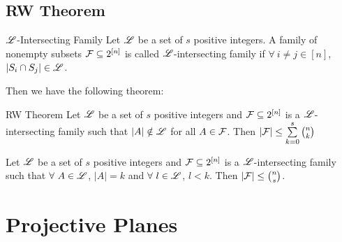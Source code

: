 \subsection{RW Theorem}
\begin{Definition}{${\mathscr{L}}$-Intersecting Family}{}
	Let ${\mathscr{L}}$ be a set of $s$ positive integers. A family of nonempty subsets $\mathcal{F}\subseteq 2^{[n]}$ is called ${\mathscr{L}}$-intersecting family if $\forall\ i\neq j\in[n]$, $|S_i\cap S_j|\in {\mathscr{L}}$. 
\end{Definition}
Then we have the following theorem:
\begin{Theorem}{RW Theorem}{}
	Let ${\mathscr{L}}$ be a set of $s$ positive integers and $\mathcal{F}\subseteq 2^{[n]}$ is a ${\mathscr{L}}$-intersecting family such that $|A|\notin {\mathscr{L}}$ for all $A\in \mathcal{F}$. Then $|\mathcal{F}|\leq \sum\limits_{k=0}^s \binom{n}{k}$
\end{Theorem}
\begin{lemma}{}{}
	Let ${\mathscr{L}}$ be a set of $s$ positive integers and $\mathcal{F}\subseteq 2^{[n]}$ is a ${\mathscr{L}}$-intersecting family such that $\forall\ A\in {\mathscr{L}}$, $|A|=k$ and $\forall\ l\in {\mathscr{L}}$, $l<k$. Then $|\mathcal{F}|\leq \binom{n}{s}$. 
\end{lemma}
\section{Projective Planes}